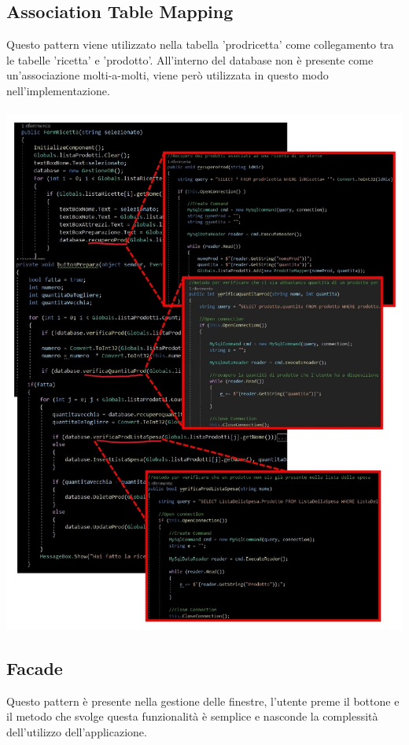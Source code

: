 \documentclass[a4paper, titlepage]{article}
\begin{document}
\subsection{Association Table Mapping}
Questo pattern viene utilizzato nella tabella 'prodricetta' come collegamento tra le tabelle 'ricetta' e 'prodotto'. All'interno del database non è presente come un'associazione molti-a-molti, viene però utilizzata in questo modo nell'implementazione.\\\\ 
\includegraphics[scale=0.40]{Immagini/AssociationTableMapping_.jpg}
\subsection{Facade}
Questo pattern è presente nella gestione delle finestre, l'utente preme il bottone e il metodo che svolge questa funzionalità è semplice e nasconde la complessità dell'utilizzo dell'applicazione.
\newpage
\end{document}

